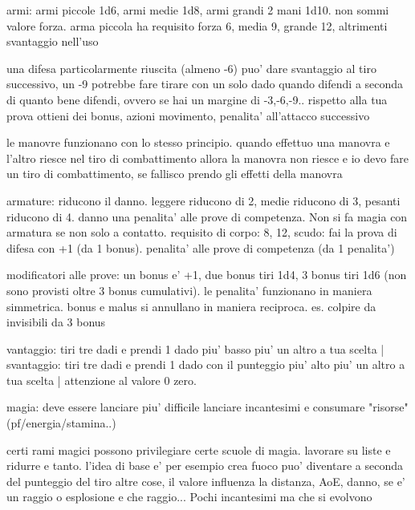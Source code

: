 \documentclass[12pt,a4paper,twoside,openany,twocolumn]{book}
\begin{document}
armi: armi piccole 1d6, armi medie 1d8, armi grandi 2 mani 1d10. non sommi valore forza. arma piccola ha requisito forza 6, media 9, grande 12, altrimenti svantaggio nell'uso

una difesa particolarmente riuscita (almeno -6) puo' dare svantaggio al tiro successivo, un -9 potrebbe fare tirare con un solo dado
quando difendi  a seconda di quanto bene difendi, ovvero se hai un margine di -3,-6,-9.. rispetto alla tua prova ottieni dei bonus, azioni movimento, penalita' all'attacco successivo

le manovre funzionano con lo stesso principio. quando effettuo una manovra e l'altro riesce nel tiro di combattimento allora la manovra non riesce e io devo fare un tiro di combattimento, se fallisco prendo gli effetti della manovra

armature: riducono il danno. leggere riducono di 2, medie riducono di 3, pesanti riducono di 4. danno una penalita' alle prove di competenza. Non si fa magia con armatura se non solo a contatto. requisito di corpo: 8, 12, 
scudo: fai la prova di difesa con +1 (da 1 bonus). penalita' alle prove di competenza (da 1 penalita')

modificatori alle prove: un bonus e' +1, due bonus tiri 1d4, 3 bonus tiri 1d6 (non sono provisti oltre 3 bonus cumulativi). le penalita' funzionano in maniera simmetrica. bonus e malus si annullano in maniera reciproca. es. colpire da invisibili da 3 bonus

vantaggio: tiri tre dadi e prendi 1 dado piu' basso piu' un altro a tua scelta   |  svantaggio: tiri tre dadi e prendi 1 dado con il punteggio piu' alto piu' un altro a tua scelta | attenzione al valore 0 zero.

magia: deve essere lanciare piu' difficile lanciare incantesimi e consumare "risorse" (pf/energia/stamina..)

certi rami magici possono privilegiare certe scuole di magia. lavorare su liste e ridurre e tanto. l'idea di base e' per esempio crea fuoco puo' diventare a seconda del punteggio del tiro altre cose, il valore influenza la distanza, AoE, danno, se e' un raggio o esplosione e che raggio...  Pochi incantesimi ma che si evolvono
\end{document}
